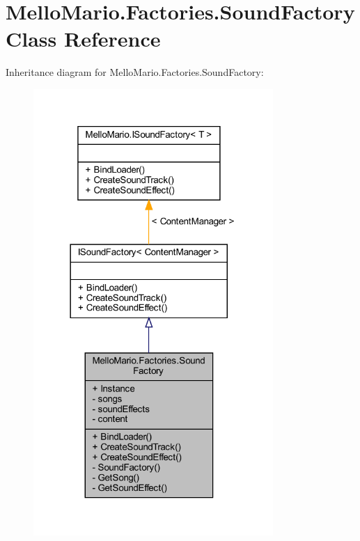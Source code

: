 \section{Mello\+Mario.\+Factories.\+Sound\+Factory Class Reference}
\label{classMelloMario_1_1Factories_1_1SoundFactory}


Inheritance diagram for Mello\+Mario.\+Factories.\+Sound\+Factory\+:
\nopagebreak
\begin{figure}[H]
\begin{center}
\leavevmode
\includegraphics[width=258pt]{classMelloMario_1_1Factories_1_1SoundFactory__inherit__graph}
\end{center}
\end{figure}


